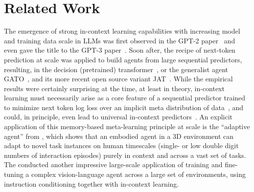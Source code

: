 \section{Related Work}
\label{app:related-work}

The emergence of strong in-context learning capabilities with increasing model and training data scale in LLMs was first observed in the GPT-2 paper~\citep{radford2019language} and even gave the title to the GPT-3 paper~\citep{brown2020language}.
Soon after, the recipe of next-token prediction at scale was applied to build agents from large sequential predictors, resulting, \eg in the decision (pretrained) transformer~\citep{chen2021decision, lee2023supervised}, or the generalist agent GATO~\citep{reed2022generalist}, and its more recent open source variant JAT~\citep{gallouedec2024jack}.
While the empirical results were certainly surprising at the time, at least in theory, in-context learning must necessarily arise as a core feature of a sequential predictor trained to minimize next token log loss over an implicit meta distribution of data~\citep{ortega2019meta, mikulik2020meta, genewein2023memory}, and could, in principle, even lead to universal in-context predictors~\citep{grau2024learning}.
An explicit application of this memory-based meta-learning principle at scale is the ``adaptive agent'' from \citet{bauer2023human}, which shows that an embodied agent in a 3D environment can adapt to novel task instances on human timescales (\ie single- or low double digit numbers of interaction episodes) purely in context and across a vast set of tasks.
The \citet{sima2024scaling} conducted another impressive large-scale application of training and fine-tuning a complex vision-language agent across a large set of environments, using instruction conditioning together with in-context learning.

